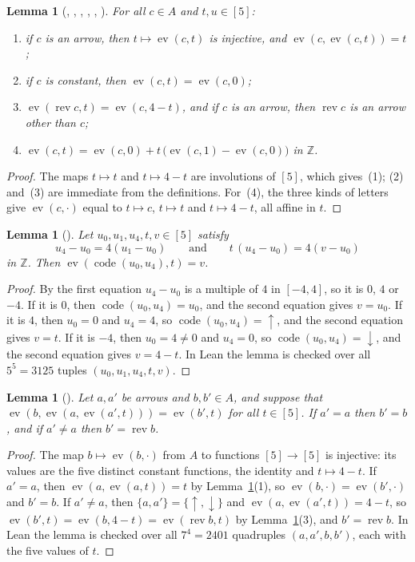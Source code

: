 \documentclass[11pt]{amsart}
\theoremstyle{plain}
\newtheorem{lemma}[theorem]{Lemma}
\theoremstyle{definition}
\newcommand{\Z}{\mathbb{Z}}
\newcommand{\up}{{\uparrow}}
\newcommand{\dn}{{\downarrow}}
\newcommand{\ev}{\operatorname{ev}}
\newcommand{\rev}{\operatorname{rev}}
\newcommand{\code}{\operatorname{code}}
\begin{document}
\begin{lemma}[, , , , , ]\label{lem:letters}
For all $c\in A$ and $t,u\in[5]$:
\begin{enumerate}
\item if $c$ is an arrow, then $t\mapsto\ev(c,t)$ is injective, and $\ev(c,\ev(c,t))=t$;
\item if $c$ is constant, then $\ev(c,t)=\ev(c,0)$;
\item $\ev(\rev c,t)=\ev(c,4-t)$, and if $c$ is an arrow, then $\rev c$ is an arrow other than $c$;
\item $\ev(c,t)=\ev(c,0)+t\,\bigl(\ev(c,1)-\ev(c,0)\bigr)$ in $\Z$.
\end{enumerate}
\end{lemma}

\begin{proof}
The maps $t\mapsto t$ and $t\mapsto 4-t$ are involutions of $[5]$, which gives~(1); (2) and~(3) are immediate from the definitions. For~(4), the three kinds of letters give $\ev(c,\cdot)$ equal to $t\mapsto c$, $t\mapsto t$ and $t\mapsto 4-t$, all affine in $t$.
\end{proof}

\begin{lemma}[]\label{lem:H}
Let $u_0,u_1,u_4,t,v\in[5]$ satisfy
\[
  u_4-u_0=4(u_1-u_0)\qquad\text{and}\qquad t\,(u_4-u_0)=4(v-u_0)
\]
in $\Z$. Then $\ev(\code(u_0,u_4),t)=v$.
\end{lemma}

\begin{proof}
By the first equation $u_4-u_0$ is a multiple of $4$ in $[-4,4]$, so it is $0$, $4$ or $-4$.
If it is $0$, then $\code(u_0,u_4)=u_0$, and the second equation gives $v=u_0$.
If it is $4$, then $u_0=0$ and $u_4=4$, so $\code(u_0,u_4)=\up$, and the second equation gives $v=t$.
If it is $-4$, then $u_0=4\ne0$ and $u_4=0$, so $\code(u_0,u_4)=\dn$, and the second equation gives $v=4-t$.
In Lean the lemma is checked over all $5^5=3125$ tuples $(u_0,u_1,u_4,t,v)$.
\end{proof}

\begin{lemma}[]\label{lem:F}
Let $a,a'$ be arrows and $b,b'\in A$, and suppose that $\ev(b,\ev(a,\ev(a',t)))=\ev(b',t)$ for all $t\in[5]$. If $a'=a$ then $b'=b$, and if $a'\ne a$ then $b'=\rev b$.
\end{lemma}

\begin{proof}
The map $b\mapsto\ev(b,\cdot)$ from $A$ to functions $[5]\to[5]$ is injective: its values are the five distinct constant functions, the identity and $t\mapsto4-t$.
If $a'=a$, then $\ev(a,\ev(a,t))=t$ by Lemma~\ref{lem:letters}(1), so $\ev(b,\cdot)=\ev(b',\cdot)$ and $b'=b$.
If $a'\ne a$, then $\{a,a'\}=\{\up,\dn\}$ and $\ev(a,\ev(a',t))=4-t$, so $\ev(b',t)=\ev(b,4-t)=\ev(\rev b,t)$ by Lemma~\ref{lem:letters}(3), and $b'=\rev b$.
In Lean the lemma is checked over all $7^4=2401$ quadruples $(a,a',b,b')$, each with the five values of $t$.
\end{proof}
\end{document}

